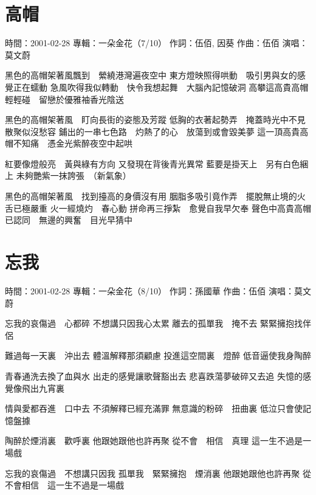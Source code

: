 \documentclass[UTF8,a4paper,oneside,twocolumn,12pt]{ctexbook}
\newcommand{\infopair}[2]{\textbullet #1：#2}
\newcommand{\zc}[1][伍佰]{\infopair{作詞}{#1}}
\newcommand{\zq}[1][伍佰]{\infopair{作曲}{#1}}
\newcommand{\zj}[1]{\infopair{專輯}{#1}}
\newcommand{\sj}[1]{\infopair{時間}{#1}}
\newenvironment{info}{\begin{flushleft}\kaishu
	}
	{\end{flushleft}\normalsize\yahei\par}
\newenvironment{lyric}{
	}
{}
\begin{document}
\section{高帽}
\begin{info}
	\sj{2001-02-28}
	\zj{一朵金花（7/10）}
	\zc[伍佰, 因葵]
	\zq
	\infopair{演唱}{莫文蔚}
\end{info}
\begin{lyric}
	黑色的高帽架著風飄到　縈繞港灣遍夜空中
	東方燈映照得哄動　吸引男與女的感覺正在蠕動
	急風吹得我似轉動　快令我想起舞　大腦內記憶破洞
	高攀這高貴高帽輕輕碰　留戀於優雅袖香光陰送

	黑色的高帽架著風　盯向長街的姿態及芳蹤
	低胸的衣著起勢弄　掩蓋時光中不見散聚似沒愁容
	鋪出的一串七色路　灼熱了的心　放蕩到或會毀美夢
	這一頂高貴高帽不知痛　憑金光紫醉夜空中起哄

	紅要像燈般亮　黃與綠有方向
	又發現在背後青光異常
	藍要是掛天上　另有白色綑上
	未夠艷紫一抹誇張　（新氣象）

	黑色的高帽架著風　找到擡高的身價沒有用
	胭脂多吸引竟作弄　擺脫無止境的火舌已極嚴重
	火一經燒灼　春心動
	拼命再三掙紮　愈覺自我早欠奉
	聲色中高貴高帽已認同　無邊的興奮　目光早猜中
\end{lyric}

\section{忘我}
\begin{info}
	\sj{2001-02-28}
	\zj{一朵金花（8/10）}
	\zc[孫國華]
	\zq
	\infopair{演唱}{莫文蔚}
\end{info}
\begin{lyric}
	忘我的哀傷過　心都碎
	不想講只因我心太累
	離去的孤單我　掩不去
	緊緊擁抱找伴侶

	難過每一天裏　沖出去
	體溫解釋那須顧慮
	投進這空間裏　燈醉
	低音逼使我身陶醉

	青春通洗去換了血與水
	出走的感覺讓歌聲豁出去
	悲喜跌蕩夢破碎又去追
	失憶的感覺像飛出九宵裏

	情與愛都吞進　口中去
	不須解釋已經充滿罪
	無意識的粉碎　扭曲裏
	低泣只會使記憶盤據

	陶醉於煙消裏　歡呼裏
	他跟她跟他也許再聚
	從不會　相信　真理
	這一生不過是一場戲

	忘我的哀傷過　不想講只因我
	孤單我　緊緊擁抱　煙消裏
	他跟她跟他也許再聚
	從不會相信　這一生不過是一場戲
\end{lyric}
\end{document}
